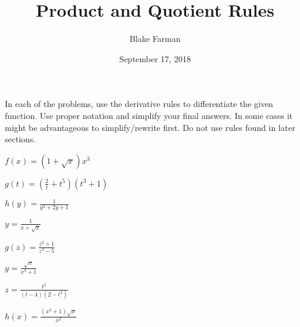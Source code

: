 \documentclass[10pt]{amsart}
\title[Product and Quotient]{Product and Quotient Rules}
\date{September 17, 2018}
\author{Blake Farman}
\begin{document}
\maketitle

\makenameslot

In each of the problems, use the derivative rules to differentiate the given function.
Use proper notation and simplify your final answers.
In some cases it might be advantageous to simplify/rewrite first.
Do not use rules found in later sections.

\begin{multicols}{2}
  \begin{thm}
    \(\displaystyle{f(x) = \left(1 + \sqrt{x}\right) x^3}\)
  \end{thm}

  \vspace{1.25in}

  \begin{thm}
    \(\displaystyle{g(t) = \left(\frac{2}{t} + t^5\right)(t^3 + 1)}\)
  \end{thm}

  \vspace{1.25in}

  \begin{thm}
    \(\displaystyle{h(y) = \frac{1}{y^3 + 2y + 1}}\)
  \end{thm}

  \vspace{1.25in}
  
  \begin{thm}
    \(\displaystyle{y = \frac{1}{x + \sqrt{x}}}\)
  \end{thm}

  \vspace{1.25in}
  
  \begin{thm}
    \(\displaystyle{g(z) = \frac{z^2 + 1}{z^3 - 5}}\)
  \end{thm}

  \vspace{1.25in}
  
  \begin{thm}
    \(\displaystyle{y = \frac{\sqrt{x}}{x^3 + 1}}\)
  \end{thm}

  \vspace{1.25in}
\end{multicols}

\newpage
\begin{multicols}{2}
  \begin{thm}
    \(\displaystyle{z = \frac{t^2}{(t - 4)(2 - t^3)}}\)
  \end{thm}

  \begin{thm}
    \(\displaystyle{h(x) = \frac{\left(x^3 + 1\right)\sqrt{x}}{x^2}}\)
  \end{thm}
\end{multicols}
\end{document}
